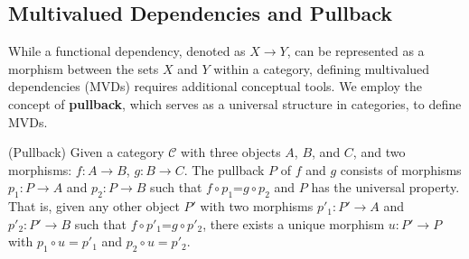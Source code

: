 \subsection{Multivalued Dependencies and Pullback }
\label{sec:mvd}


While a functional dependency, denoted as $X \to Y$, can be represented as a morphism between the sets $X$ and $Y$ within a category, defining multivalued dependencies (MVDs) requires additional conceptual tools. We employ the concept of \textbf{pullback}, which serves as a universal structure in categories, to define MVDs. 







\begin{definition} (Pullback) Given a category $\mathcal{C}$ with three objects $A$, $B$, and $C$, and two morphisms: $f: A \to B$, $g: B \to C$. The pullback $P$ of $f$ and $g$ consists of morphisms $p_1: P \to A$  and $p_2: P \to B$ such that $f \circ p_1$=$g \circ p_2$  and $P$ has the universal property. That is, given any other object $P'$ with   two morphisms $p'_1: P' \to A$  and $p'_2: P' \to B$ such that $f \circ p'_1$=$g \circ p'_2$, there exists a unique morphism $u: P' \to  P$ with $p_1 \circ u = p'_1$ and  $p_2 \circ u = p'_2$.\end{definition}

